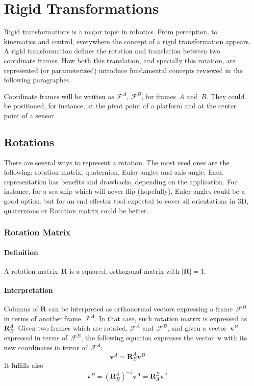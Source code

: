 
\section{Rigid Transformations}

Rigid transformations is a major topic in robotics. From perception, to kinematics and control, everywhere the concept of a rigid transformation appears. A rigid transformation defines the rotation and translation between two coordinate frames. How  both this translation, and specially this rotation, are represented (or parameterized) introduce fundamental concepts reviewed in the following paragraphes. 

Coordinate frames will be written as $\mathcal{F}^A,\ \mathcal{F}^B$, for frames~$A$ and~$B$. They could be positioned, for instance, at the pivot point of a platform and at the center point of a sensor.  

\subsection{Rotations}
There are several ways to represent a rotation. The most used ones are the following: rotation matrix, quaternion, Euler angles and axis angle. Each representation has benefits and drawbacks, depending on the application. For instance, for a sea ship which will never flip (hopefully), Euler angles could be a good option, but for an end effector tool expected to cover all orientations in 3D, quaternions or Rotation matrix could be better. 

\subsubsection{Rotation Matrix}
\label{subsec:rotation_matrix}
\paragraph{Definition} A rotation matrix~$\mathbf{R}$ is a squared, orthogonal matrix with $|\mathbf{R}|=1$. 

\paragraph{Interpretation} Columns of $\mathbf{R}$ can be interpreted as orthonormal vectors expressing a frame~$\mathcal{F}^B$ in terms of another frame~$\mathcal{F}^A$. In that case, such rotation matrix is expressed as~$\mathbf{R}^A_B$. Given two frames which are rotated, $\mathcal{F}^A$ and~$\mathcal{F}^B$, and given a vector~$\mathbf{v}^B$ expressed in terms of~$\mathcal{F}^B$, the following equation expresses the vector~$\mathbf{v}$ with its new coordinates in terms of~$\mathcal{F}^A$:
\begin{equation}
 \mathbf{v}^A = \mathbf{R}^A_B \mathbf{v}^B
\end{equation}
It fulfills also 
\begin{equation}
 \mathbf{v}^B = (\mathbf{R}^A_B)^{-1} \mathbf{v}^A = \mathbf{R}^B_A \mathbf{v}^A
\end{equation}

